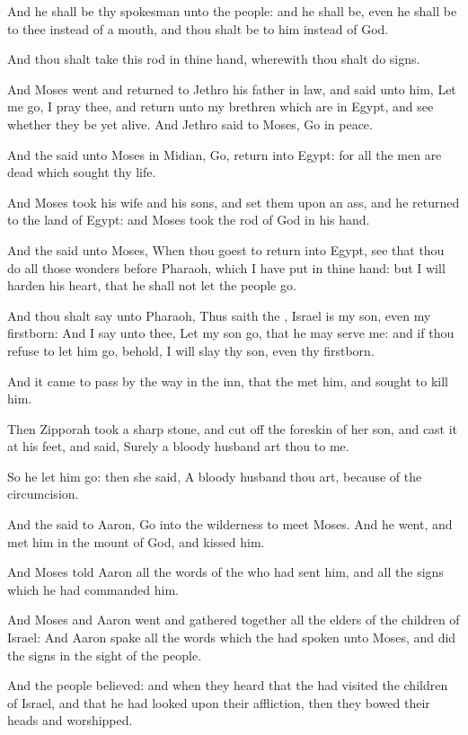 \verse And he shall be thy spokesman unto the people: and he shall be, even he shall be to thee instead of a mouth, and thou shalt be to him instead of God.

\verse And thou shalt take this rod in thine hand, wherewith thou shalt do signs.

\verse And Moses went and returned to Jethro his father in law, and said unto him, Let me go, I pray thee, and return unto my brethren which are in Egypt, and see whether they be yet alive. And Jethro said to Moses, Go in peace.

\verse And the \LORD said unto Moses in Midian, Go, return into Egypt: for all the men are dead which sought thy life.

\verse And Moses took his wife and his sons, and set them upon an ass, and he returned to the land of Egypt: and Moses took the rod of God in his hand.

\verse And the \LORD said unto Moses, When thou goest to return into Egypt, see that thou do all those wonders before Pharaoh, which I have put in thine hand: but I will harden his heart, that he shall not let the people go.

\verse And thou shalt say unto Pharaoh, Thus saith the \LORD, Israel is my son, even my firstborn: \verse And I say unto thee, Let my son go, that he may serve me: and if thou refuse to let him go, behold, I will slay thy son, even thy firstborn.

\verse And it came to pass by the way in the inn, that the \LORD met him, and sought to kill him.

\verse Then Zipporah took a sharp stone, and cut off the foreskin of her son, and cast it at his feet, and said, Surely a bloody husband art thou to me.

\verse So he let him go: then she said, A bloody husband thou art, because of the circumcision.

\verse And the \LORD said to Aaron, Go into the wilderness to meet Moses.  And he went, and met him in the mount of God, and kissed him.

\verse And Moses told Aaron all the words of the \LORD who had sent him, and all the signs which he had commanded him.

\verse And Moses and Aaron went and gathered together all the elders of the children of Israel: \verse And Aaron spake all the words which the \LORD had spoken unto Moses, and did the signs in the sight of the people.

\verse And the people believed: and when they heard that the \LORD had visited the children of Israel, and that he had looked upon their affliction, then they bowed their heads and worshipped.

